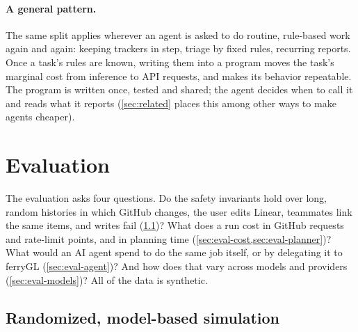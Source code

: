 \documentclass[11pt,a4paper]{article}
\newcommand{\ferry}{ferryGL}
\begin{document}
\paragraph{A general pattern.} The same split applies wherever an agent is asked to do routine,
rule-based work again and again: keeping trackers in step, triage by fixed rules, recurring
reports. Once a task's rules are known, writing them into a program moves the task's marginal
cost from inference to API requests, and makes its behavior repeatable. The program is written
once, tested and shared; the agent decides when to call it and reads what it reports
(\cref{sec:related} places this among other ways to make agents cheaper).

\section{Evaluation}
\label{sec:evaluation}

The evaluation asks four questions. Do the safety invariants hold over long, random histories in
which GitHub changes, the user edits Linear, teammates link the same items, and writes fail
(\cref{sec:eval-sim})? What does a run cost in GitHub requests and rate-limit points, and in
planning time (\cref{sec:eval-cost,sec:eval-planner})? What would an AI agent spend to do the
same job itself, or by delegating it to \ferry{} (\cref{sec:eval-agent})? And how does that vary
across models and providers (\cref{sec:eval-models})? All of the data is synthetic.

\subsection{Randomized, model-based simulation}
\label{sec:eval-sim}
\end{document}
